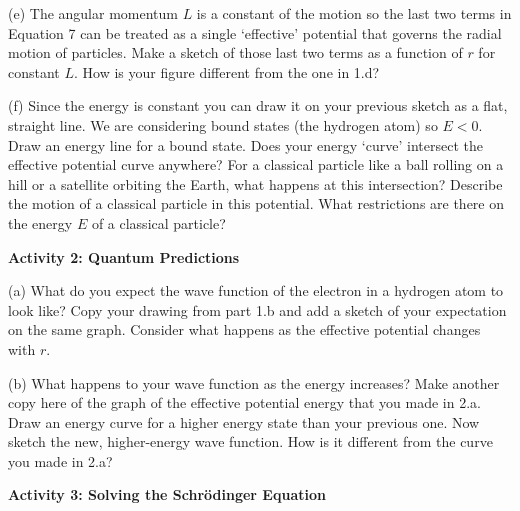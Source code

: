 \newpage

(e) The angular momentum $L$ is a constant of the motion so the last two terms in 
Equation 7 can be treated as a single `effective' potential that governs the radial motion
of particles.
Make a sketch of those last two terms as a function of $r$ for constant $L$.
How is your figure different from the one in 1.d?
\vskip 3.0cm

(f) Since the energy is constant you can draw it on your previous sketch as a flat, straight
line. We are considering bound states (the hydrogen atom) so $E < 0$.
Draw an energy line for a bound state.
Does your energy `curve' intersect the effective potential curve anywhere?
For a classical particle like a ball rolling on a hill or a satellite orbiting the
Earth,
what happens at this intersection?
Describe the motion of a classical particle in this potential.
What restrictions are there on the energy $E$ of a classical particle?
\vskip 3.0cm

\textbf{Activity 2: Quantum Predictions}

(a) What do you expect the wave function of the electron in a hydrogen atom to look like?
Copy your drawing from part 1.b and add
a sketch of your expectation on the same graph. Consider what happens
as the effective potential changes with $r$.
\vskip 3.0cm

(b) What happens to your wave function as the energy increases?
Make another copy here of the graph of the effective potential energy that you made in 2.a.
Draw an energy curve for a higher energy state than your previous one.
Now sketch the new, higher-energy wave function.
How is it different from the curve you made in 2.a?
\vskip 3.0cm

\textbf{Activity 3: Solving the Schr\"odinger Equation}

